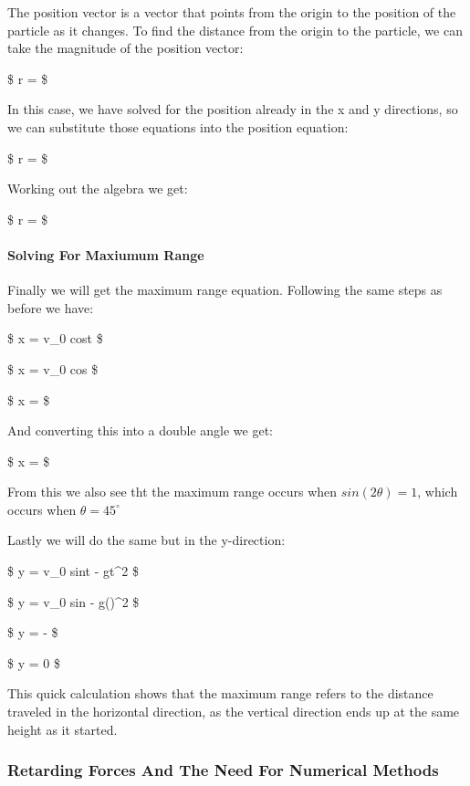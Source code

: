 \documentclass[11pt]{article}
\begin{document}
The position vector is a vector that points from the origin to the
position of the particle as it changes. To find the distance from the
origin to the particle, we can take the magnitude of the position
vector:

\$ r =  \$

In this case, we have solved for the position already in the x and y
directions, so we can substitute those equations into the position
equation:

\$ r =
 \$

Working out the algebra we get:

\$ r =  \$

\hypertarget{solving-for-maxiumum-range}{%
\paragraph{\texorpdfstring{\textbf{Solving For Maxiumum
Range}}{Solving For Maxiumum Range}}\label{solving-for-maxiumum-range}}

Finally we will get the maximum range equation. Following the same steps
as before we have:

\$ x = v\_0 cos\theta t \$

\$ x = v\_0 cos\theta {} \$

\$ x =  \$

And converting this into a double angle we get:

\$ x =  \$

From this we also see tht the maximum range occurs when
\(sin(2\theta) = 1\), which occurs when \(\theta = 45^{\circ}\)

Lastly we will do the same but in the y-direction:

\$ y = v\_0 sin\theta t - gt\^{}2 \$

\$ y = v\_0 sin\theta {} -
g()\^{}2 \$

\$ y =  -  \$

\$ y = 0 \$

This quick calculation shows that the maximum range refers to the
distance traveled in the horizontal direction, as the vertical direction
ends up at the same height as it started.

    \hypertarget{retarding-forces-and-the-need-for-numerical-methods}{%
\subsubsection{\texorpdfstring{\textbf{Retarding Forces And The Need For
Numerical
Methods}}{Retarding Forces And The Need For Numerical Methods}}\label{retarding-forces-and-the-need-for-numerical-methods}}
\end{document}
